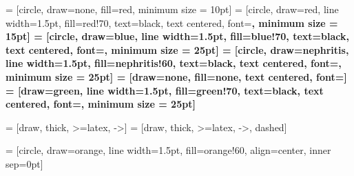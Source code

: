 
 = [circle, draw=none, fill=red, minimum size = 10pt]
 = [circle, draw=red, line width=1.5pt, fill=red!70, text=black,
text centered, font=\bf \normalsize, minimum size = 15pt]
 = [circle, draw=blue, line width=1.5pt, fill=blue!70, text=black, text centered, font=\bf \normalsize, minimum size = 25pt]
 = [circle, draw=nephritis, line width=1.5pt, fill=nephritis!60, text=black, text centered, font=\bf \normalsize, minimum size = 25pt]
 = [draw=none, fill=none, text centered, font=\bf \normalsize]
= [draw=green, line width=1.5pt, fill=green!70, text=black,
text centered, font=\bf \normalsize, minimum size = 25pt]

  = [draw, thick, >=latex, ->]
  = [draw, thick, >=latex, ->, dashed]

 = [circle, draw=orange, line width=1.5pt, fill=orange!60, align=center, inner sep=0pt]


